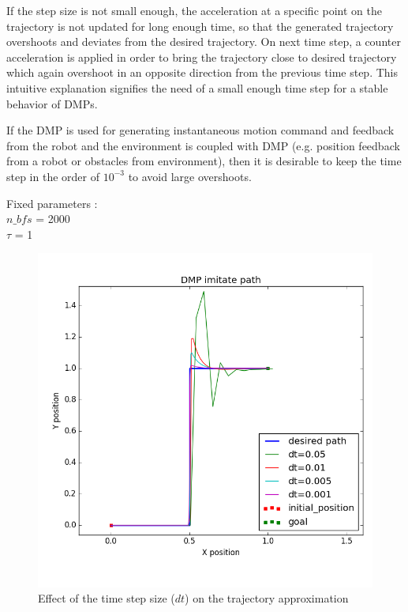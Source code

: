 If the step size is not small enough, the acceleration at a specific point on the trajectory is not updated for long enough time, so that the generated trajectory overshoots and deviates from the desired trajectory. On next time step, a counter acceleration is applied in order to bring the trajectory close to desired trajectory which again overshoot in an opposite direction from the previous time step. This intuitive explanation signifies the need of a small enough time step for a stable behavior of DMPs.   

If the DMP is used for generating instantaneous motion command and feedback from the robot and the environment is coupled with DMP (e.g. position feedback from a robot or obstacles from environment), then it is desirable to keep the time step in the order of $10^{-3}$ to avoid large overshoots. 


Fixed parameters : \\
$n\_bfs$ = 2000 \\
$\tau$ = 1 



\begin{figure}
	\includegraphics[scale=0.7]{images/dt_.png}
	\caption{Effect of the time step size ($dt$) on the trajectory approximation}
	\label{fig:dt_}
\end{figure}



